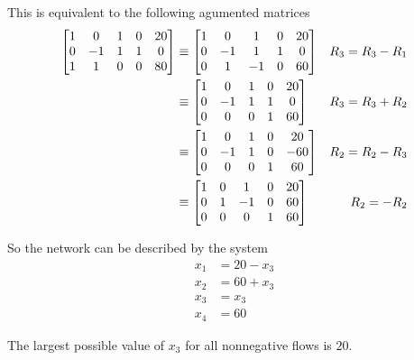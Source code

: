\documentclass{../mathhomework}
\newenvironment{Mat}{\begin{bmatrix}}{\end{bmatrix}}
\begin{document}
\begin{problem}[1.6\#11]
\begin{solution}
        This is equivalent to the following agumented matrices
        \begin{align*}
            \begin{Mat}
                1 & 0 & 1 & 0 & 20 \\
                0 & -1 & 1 & 1 & 0 \\
                1 & 1 & 0 & 0 & 80
            \end{Mat} & \equiv
            \begin{Mat}
                1 & 0 & 1 & 0 & 20 \\
                0 & -1 & 1 & 1 & 0 \\
                0 & 1 & -1 & 0 & 60
            \end{Mat} & R_3 = R_3 - R_1 \\ & \equiv
            \begin{Mat}
                1 & 0 & 1 & 0 & 20 \\
                0 & -1 & 1 & 1 & 0 \\
                0 & 0 & 0 & 1 & 60
            \end{Mat} & R_3 = R_3 + R_2 \\ & \equiv
            \begin{Mat}
                1 & 0 & 1 & 0 & 20 \\
                0 & -1 & 1 & 0 & -60 \\
                0 & 0 & 0 & 1 & 60
            \end{Mat} & R_2 = R_2 - R_3 \\ & \equiv
            \begin{Mat}
                1 & 0 & 1 & 0 & 20 \\
                0 & 1 & -1 & 0 & 60 \\
                0 & 0 & 0 & 1 & 60
            \end{Mat} & R_2 = -R_2
        \end{align*}

        So the network can be described by the system
        \begin{align*}
            x_1 &= 20 - x_3 \\
            x_2 &= 60 + x_3 \\
            x_3 &= x_3 \\
            x_4 &= 60
        \end{align*}

        The largest possible value of $x_3$ for all nonnegative flows is $20$.
    \end{solution}
\end{problem}
\end{document}
